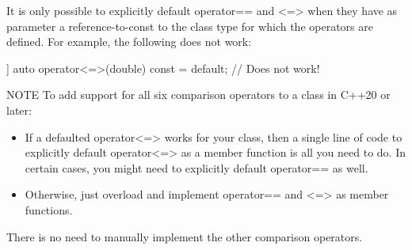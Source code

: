 It is only possible to explicitly default operator== and <=> when they have as parameter a reference-to-const to the class type for which the operators are defined. For example, the following does not work:

\begin{cpp}
[[nodiscard]] auto operator<=>(double) const = default; // Does not work!
\end{cpp}

\begin{myNotic}{NOTE}
To add support for all six comparison operators to a class in C++20 or later:

\begin{itemize}
\item
If a defaulted operator<=> works for your class, then a single line of code to explicitly default operator<=> as a member function is all you need to do. In certain cases, you might need to explicitly default operator== as well.

\item
Otherwise, just overload and implement operator== and <=> as member functions.
\end{itemize}

There is no need to manually implement the other comparison operators.
\end{myNotic}
